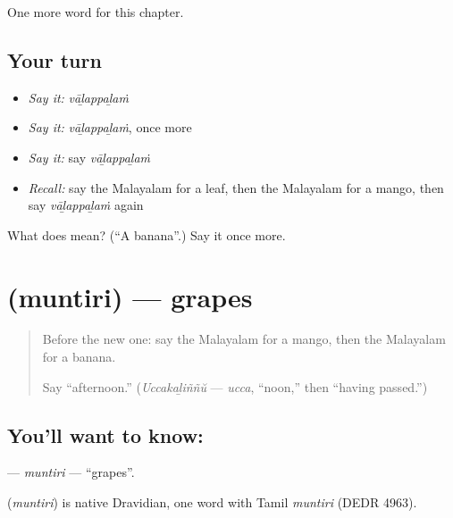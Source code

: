 \begin{grammarlens}[title={What you've built}]
One more word for this chapter.
\end{grammarlens}

\subsection*{Your turn}
\begin{itemize}
\raggedright
  \item \emph{Say it:} \emph{vāḻappaḻaṁ}
  \item \emph{Say it:} \emph{vāḻappaḻaṁ}, once more
  \item \emph{Say it:} say \emph{vāḻappaḻaṁ}
  \item \emph{Recall:} say the Malayalam for a leaf, then the Malayalam for a mango, then say \emph{vāḻappaḻaṁ} again
\end{itemize}

\begin{tcolorbox}[breakable,colback=teal!4,colframe=teal!35!black,title={Before you move on}]
What does  mean? (\textquotedblleft{}A banana\textquotedblright{}.) Say it once more.
\end{tcolorbox}
\section[\texorpdfstring{\ml{മുന്തിരി} (muntiri)}{മുന്തിരി (muntiri)}]{ (muntiri) — grapes}

\label{lesson:ML-C149-muntiri}



\begin{quote}
Before the new one: say the Malayalam for a mango, then the Malayalam for a banana.

Say \textquotedblleft{}afternoon.\textquotedblright{} (\emph{Uccakaḻiññŭ} — \emph{ucca}, \textquotedblleft{}noon,\textquotedblright{} then \textquotedblleft{}having passed.\textquotedblright{})
\end{quote}

\subsection*{You'll want to know: }
\textbf{} — \emph{muntiri} — \textquotedblleft{}grapes\textquotedblright{}.

\begin{cousinweb}
\textbf{} (\emph{muntiri}) is native Dravidian, one word with Tamil \emph{muntiri} (DEDR 4963).
\end{cousinweb}

